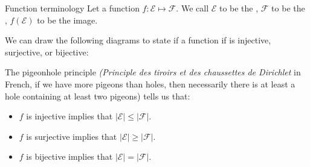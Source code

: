 \documentclass[a4paper]{article}
\begin{document}
\begin{parag}{Function terminology}
    Let a function $f: \mathcal{E} \mapsto \mathcal{F}$. We call $\mathcal{E}$ to be the , $\mathcal{F}$ to be the , $f\left(\mathcal{E}\right)$ to be the image.

    We can draw the following diagrams to state if a function if is injective, surjective, or bijective:

    The pigeonhole principle \textit{(Principle des tiroirs et des chaussettes de Dirichlet} in French, if we have more pigeons than holes, then necessarily there is at least a hole containing at least two pigeons) tells us that:

    \begin{itemize}
        \item $f$ is injective implies that $\left|\mathcal{E}\right| \leq \left|\mathcal{F}\right|$.
        \item $f$ is surjective implies that $\left|\mathcal{E}\right| \geq \left|\mathcal{F}\right|$.
        \item $f$ is bijective implies that $\left|\mathcal{E}\right| = \left|\mathcal{F}\right|$.
    \end{itemize}
\end{parag}
\end{document}
